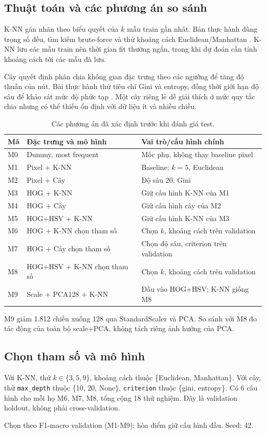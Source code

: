 
\subsection{Thuật toán và các phương án so sánh}
K-NN gán nhãn theo biểu quyết của \(k\) mẫu train gần nhất. Bản thực hành dùng trọng số đều, tìm kiếm brute-force và thử khoảng cách Euclidean/Manhattan \cite{knn}. K-NN lưu các mẫu train nên thời gian fit thường ngắn, trong khi dự đoán cần tính khoảng cách tới các mẫu đã lưu.

Cây quyết định phân chia không gian đặc trưng theo các ngưỡng để tăng độ thuần của nút. Bài thực hành thử tiêu chí Gini và entropy, đồng thời giới hạn độ sâu để khảo sát mức độ phức tạp \cite{tree}. Một cây riêng lẻ dễ giải thích ở mức quy tắc chia nhưng có thể thiếu ổn định với dữ liệu ít và nhiều chiều.

\begin{table}[H]\centering\small
\caption{Các phương án đã xác định trước khi đánh giá test.}\label{tab:models}
\begin{tabularx}{\linewidth}{lY Y}\toprule
Mã & Đặc trưng và mô hình & Vai trò/cấu hình chính\\\midrule
M0 & Dummy, most frequent & Mốc phụ, không thay baseline pixel\\
M1 & Pixel + K-NN & Baseline: \(k=5\), Euclidean\\
M2 & Pixel + Cây & Độ sâu 20, Gini\\
M3 & HOG + K-NN & Giữ cấu hình K-NN của M1\\
M4 & HOG + Cây & Giữ cấu hình cây của M2\\
M5 & HOG+HSV + K-NN & Giữ cấu hình K-NN của M3\\
M6 & HOG + K-NN chọn tham số & Chọn \(k\), khoảng cách trên validation\\
M7 & HOG + Cây chọn tham số & Chọn độ sâu, criterion trên validation\\
M8 & HOG+HSV + K-NN chọn tham số & Chọn \(k\), khoảng cách trên validation\\
M9 & Scale + PCA128 + K-NN & Đầu vào HOG+HSV; K-NN giống M8\\\bottomrule
\end{tabularx}
\end{table}

M9 giảm 1.812 chiều xuống 128 qua StandardScaler và PCA. So sánh với M8 đo tác động của toàn bộ scale+PCA, không tách riêng ảnh hưởng của PCA.

\subsection{Chọn tham số và mô hình}
Với K-NN, thử \(k\in\{3,5,9\}\), khoảng cách thuộc \{Euclidean, Manhattan\}. Với cây, thử \texttt{max\_depth} thuộc \{10, 20, None\}, \texttt{criterion} thuộc \{gini, entropy\}. Có 6 cấu hình cho mỗi họ M6, M7, M8, tổng cộng 18 thử nghiệm. Đây là validation holdout, không phải cross-validation.

Chọn theo F1-macro validation (M1-M9); hòa điểm giữ cấu hình đầu. Seed: 42.

